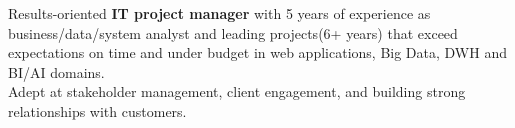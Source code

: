 Results-oriented \textbf{IT project manager} with 5 years of experience as business/data/system analyst and leading projects(6+ years)  that exceed expectations on time and under budget in web applications, Big Data, DWH and BI/AI  domains.\\ Adept at stakeholder management, client engagement, and building strong relationships with customers.